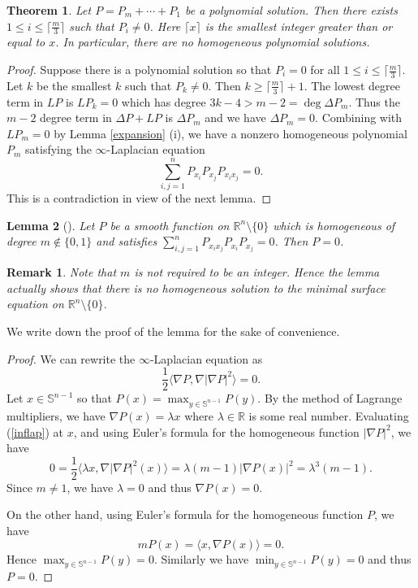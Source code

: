 \documentclass[pdflatex,sn-mathphys-num]{sn-jnl}%
\theoremstyle{thmstyleone}%
\newtheorem{theorem}{Theorem}[section]%
\newtheorem{lemma}[theorem]{Lemma}
\theoremstyle{thmstyletwo}%
\newtheorem{remark}{Remark}%
\theoremstyle{thmstylethree}%
\newcommand{\R}{\mathbb{R}}
\newcommand{\SSS}{\mathbb{S}}
\begin{document}
\begin{theorem}\label{homo}
	Let $P=P_m+\cdots+P_1$ be a polynomial solution. Then there exists $1\le i\le \lceil\frac{m}{3}\rceil$ such that $P_i\neq0$. Here $\lceil x\rceil$ is the smallest integer greater than or equal to $x$.
	In particular, there are no homogeneous polynomial solutions.
\end{theorem}
\begin{proof} Suppose there is a polynomial solution so that $P_i=0$ for all $1\le i\le \lceil\frac{m}{3}\rceil$. Let $k$ be the smallest $k$ such that $P_k\neq0$. Then $k\ge \lceil\frac{m}{3}\rceil+1$. The lowest degree term in $LP$ is $LP_{k}=0$ which has degree $3k-4>m-2=\deg \Delta P_m$. Thus the $m-2$ degree term in $\Delta P+LP$ is $\Delta P_m$ and we have $\Delta P_m=0$. Combining with $LP_m=0$ by Lemma \ref{expansion} (i), we have a nonzero homogeneous polynomial $P_m$ satisfying the $\infty$-Laplacian equation
	\[\sum_{i,j=1}^nP_{x_i}P_{x_j}P_{x_ix_j}=0.\]
	This is a contradiction in view of the next lemma.
\end{proof}

\begin{lemma}[{\cite[Proposition 4.1]{tkachev2016non}}]\label{infhar}
	Let $P$ be a smooth  function  on $\R^{n}\setminus \{0\}$ which is homogeneous of degree $m\notin \{0,1\}$ and satisfies $\sum_{i,j=1}^nP_{x_ix_j}P_{x_i}P_{x_j}=0$. Then $P=0$.
\end{lemma}
\begin{remark}
	Note that $m$ is not required to be an integer. Hence the lemma actually shows that there is no homogeneous solution to the minimal surface equation on $\R^{n}\setminus\{0\}$.
\end{remark}
We write down the proof of the lemma for the sake of convenience.
\begin{proof}
	We can rewrite the $\infty$-Laplacian equation as 
	\begin{equation}\label{inflap}
		\frac{1}{2}\langle \nabla P,\nabla |\nabla P|^2\rangle=0.
	\end{equation} 
	Let $x\in \SSS^{n-1}$ so that $P(x)=\max _{y\in \SSS^{n-1}}P(y)$. By the method of Lagrange multipliers, we have $\nabla P(x)=\lambda x$ where $\lambda\in\R$ is some real number. Evaluating (\ref{inflap}) at $x$, and using Euler's formula for the homogeneous function $|\nabla P|^2$, we have
	\[0=\frac{1}{2}\langle\lambda x,\nabla|\nabla P|^2(x)\rangle=\lambda (m-1)|\nabla P(x)|^2=\lambda^3(m-1).\]
	Since $m\neq 1$, we have $\lambda=0$ and thus $\nabla P(x)=0$.
	
	On the other hand, using Euler's formula for the homogeneous function $P$, we have
	\[mP(x)=\langle x,\nabla P(x)\rangle=0.\]
	Hence $\max _{y\in \SSS^{n-1}}P(y)=0$. Similarly we have $\min _{y\in \SSS^{n-1}}P(y)=0$ and thus $P=0$.
\end{proof}
\end{document}
